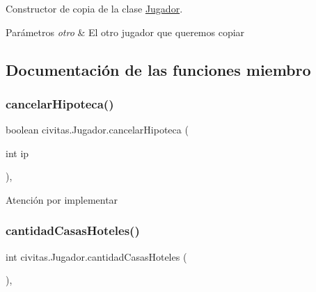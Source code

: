 Constructor de copia de la clase \hyperlink{classcivitas_1_1Jugador}{Jugador}. 
\begin{DoxyParams}{Parámetros}
{\em otro} & El otro jugador que queremos copiar \\
\hline
\end{DoxyParams}


\subsection{Documentación de las funciones miembro}
\mbox{\label{classcivitas_1_1Jugador_a3258e1efe659b753aae45e38d6d7a6e2}} 
\subsubsection{\texorpdfstring{cancelar\+Hipoteca()}{cancelarHipoteca()}}
{\footnotesize\ttfamily boolean civitas.\+Jugador.\+cancelar\+Hipoteca (\begin{DoxyParamCaption}\item[{int}]{ip }\end{DoxyParamCaption})\hspace{0.3cm}{\ttfamily [inline]}, {\ttfamily [package]}}

\begin{DoxyWarning}{Atención}
por implementar 
\end{DoxyWarning}
\mbox{\label{classcivitas_1_1Jugador_af26359708ca0a967152c3e38ef0e0c6b}} 
\subsubsection{\texorpdfstring{cantidad\+Casas\+Hoteles()}{cantidadCasasHoteles()}}
{\footnotesize\ttfamily int civitas.\+Jugador.\+cantidad\+Casas\+Hoteles (\begin{DoxyParamCaption}{ }\end{DoxyParamCaption})\hspace{0.3cm}{\ttfamily [inline]}, {\ttfamily [package]}}

